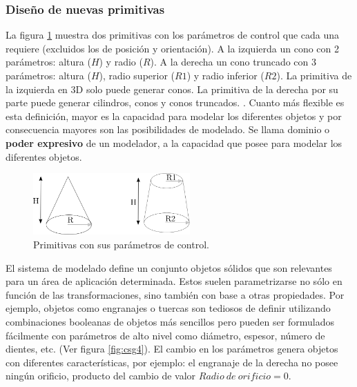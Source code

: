\subsubsection{Diseño de nuevas primitivas}
La figura \ref{fig:csg3} muestra dos primitivas con los parámetros de control que cada una requiere (excluidos los de posición y orientación). A la izquierda un cono con 2 parámetros: altura ($H$) y radio ($R$). A la derecha un cono truncado con 3 parámetros: altura ($H$), radio superior ($R1$) y radio inferior ($R2$). La primitiva de la izquierda en 3D solo puede generar conos. La primitiva de la  derecha por su parte puede generar cilindros, conos y conos truncados. 
\citep{Ramos2011}. 
Cuanto más flexible es esta definición, mayor es la capacidad para modelar los diferentes objetos y por consecuencia mayores son las posibilidades de modelado. Se llama dominio o \textbf{poder expresivo} de un modelador, a la capacidad que posee para modelar los diferentes objetos. %

\begin{figure}[ht]
\includegraphics[width=6cm]{Img/GEO/geo-cono.png}
\centering
\caption{\footnotesize{Primitivas con sus parámetros de control.}}
\label{fig:csg3}
\end{figure}


El sistema de modelado define un conjunto objetos sólidos que son relevantes para un área de aplicación determinada. Estos suelen parametrizarse no sólo en función de las transformaciones, sino también con base a otras propiedades. Por ejemplo, objetos como engranajes o tuercas son tediosos de definir utilizando combinaciones booleanas de objetos más sencillos pero pueden ser formulados fácilmente con parámetros de alto nivel como diámetro, espesor, número de dientes, etc. (Ver figura \ref{fig:csg4}). El cambio en los parámetros genera objetos con diferentes características, por ejemplo: el engranaje de la derecha no posee ningún orificio, producto del cambio de valor $Radio \ de \ orificio = 0$.


